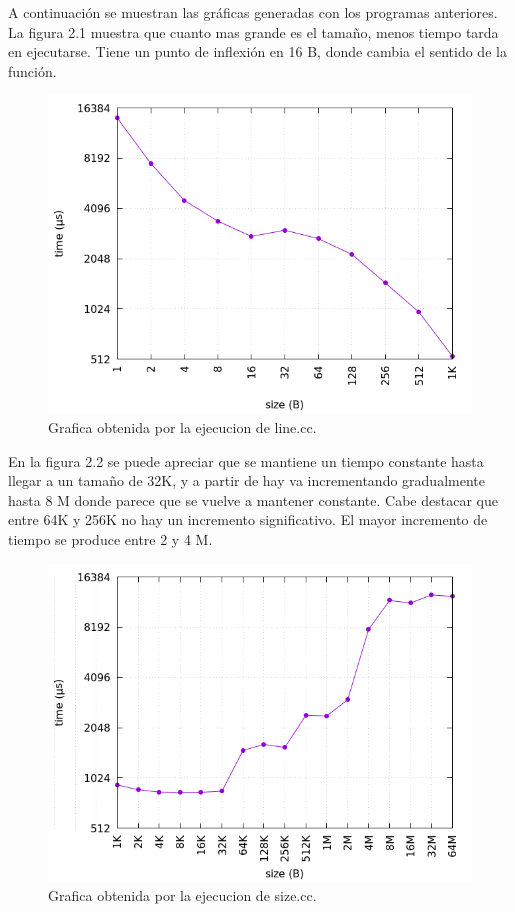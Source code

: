 	A continuación se muestran las gráficas generadas con los programas anteriores. \\
	
	La figura 2.1 muestra que cuanto mas grande es el tamaño, menos tiempo tarda en ejecutarse. Tiene un punto de inflexión en 16 B, donde cambia el sentido de la función.
	
	\begin{figure}[htb]
		\centering
		\includegraphics[width=1.0\textwidth]{./imagenes/line}
		\caption{Grafica obtenida por la ejecucion de line.cc.} \label{fig:1}
	\end{figure}
	
	En la figura 2.2 se puede apreciar que se mantiene un tiempo constante hasta llegar a un tamaño de 32K, y a partir de hay va incrementando gradualmente hasta 8 M donde parece que se vuelve a mantener constante. Cabe destacar que entre 64K y 256K no hay un incremento significativo. El mayor incremento de tiempo se produce entre 2 y 4 M.
	
	\begin{figure}[htb]
		\centering
		\includegraphics[width=1.0\textwidth]{./imagenes/size}
		\caption{Grafica obtenida por la ejecucion de size.cc.} \label{fig:1}
	\end{figure}
	
